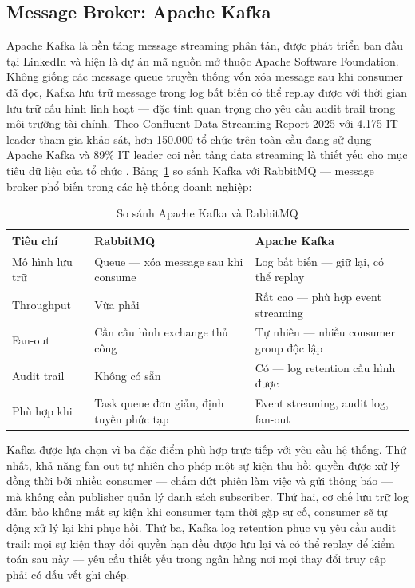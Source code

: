 \documentclass[../DoAn.tex]{subfiles}
\begin{document}
\subsection{Message Broker: Apache Kafka}
\label{subsection:3.2.3}

Apache Kafka là nền tảng message streaming phân tán, được phát triển ban đầu tại LinkedIn và hiện là dự án mã nguồn mở thuộc Apache Software Foundation. Không giống các message queue truyền thống vốn xóa message sau khi consumer đã đọc, Kafka lưu trữ message trong log bất biến có thể replay được với thời gian lưu trữ cấu hình linh hoạt — đặc tính quan trọng cho yêu cầu audit trail trong môi trường tài chính. Theo Confluent Data Streaming Report 2025 với 4.175 IT leader tham gia khảo sát, hơn 150.000 tổ chức trên toàn cầu đang sử dụng Apache Kafka và 89\% IT leader coi nền tảng data streaming là thiết yếu cho mục tiêu dữ liệu của tổ chức \cite{confluent_streaming_2025}. Bảng~\ref{tab:kafka-vs-rabbitmq} so sánh Kafka với RabbitMQ — message broker phổ biến trong các hệ thống doanh nghiệp:

\begin{table}[H]
\centering
\caption{So sánh Apache Kafka và RabbitMQ}
\label{tab:kafka-vs-rabbitmq}
\begin{tabular}{|p{3.5cm}|p{5cm}|p{5cm}|}
\hline
\textbf{Tiêu chí} & \textbf{RabbitMQ} & \textbf{Apache Kafka} \\
\hline
Mô hình lưu trữ & Queue — xóa message sau khi consume & Log bất biến — giữ lại, có thể replay \\
\hline
Throughput & Vừa phải & Rất cao — phù hợp event streaming \\
\hline
Fan-out & Cần cấu hình exchange thủ công & Tự nhiên — nhiều consumer group độc lập \\
\hline
Audit trail & Không có sẵn & Có — log retention cấu hình được \\
\hline
Phù hợp khi & Task queue đơn giản, định tuyến phức tạp & Event streaming, audit log, fan-out \\
\hline
\end{tabular}
\end{table}

Kafka được lựa chọn vì ba đặc điểm phù hợp trực tiếp với yêu cầu hệ thống. Thứ nhất, khả năng fan-out tự nhiên cho phép một sự kiện thu hồi quyền được xử lý đồng thời bởi nhiều consumer — chấm dứt phiên làm việc và gửi thông báo — mà không cần publisher quản lý danh sách subscriber. Thứ hai, cơ chế lưu trữ log đảm bảo không mất sự kiện khi consumer tạm thời gặp sự cố, consumer sẽ tự động xử lý lại khi phục hồi. Thứ ba, Kafka log retention phục vụ yêu cầu audit trail: mọi sự kiện thay đổi quyền hạn đều được lưu lại và có thể replay để kiểm toán sau này — yêu cầu thiết yếu trong ngân hàng nơi mọi thay đổi truy cập phải có dấu vết ghi chép.
\end{document}

